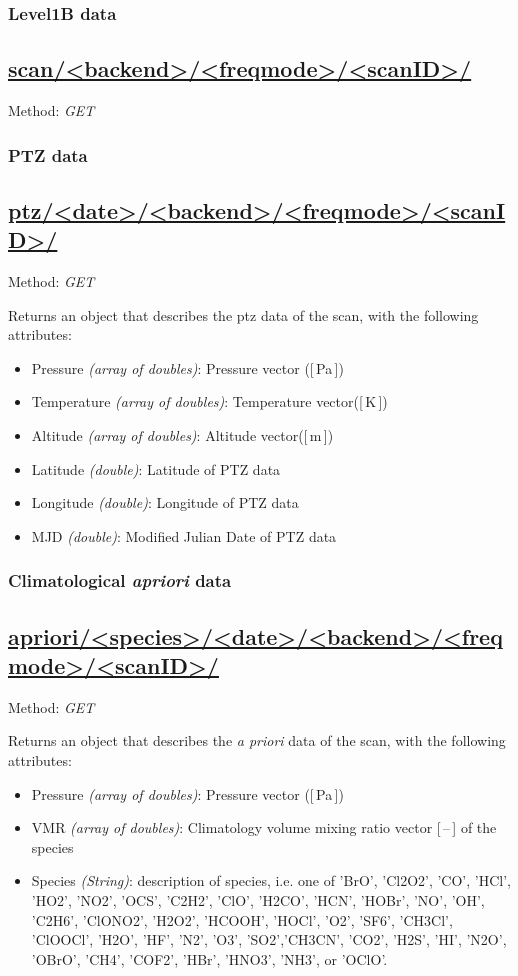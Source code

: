 \subsubsection{Level1B data}
\subsection*{\url{scan/<backend>/<freqmode>/<scanID>/}}
Method: \emph{GET}

\subsubsection{PTZ data}
\subsection*{\url{ptz/<date>/<backend>/<freqmode>/<scanID>/}}
Method: \emph{GET}

Returns an object that describes the ptz data of the scan,
with the following attributes:

\begin{itemize}
    \item Pressure \emph{(array of doubles)}: Pressure vector ([\,Pa\,])
    \item Temperature \emph{(array of doubles)}: Temperature vector([\,K\,])
    \item Altitude \emph{(array of doubles)}:  Altitude vector([\,m\,])
    \item Latitude \emph{(double)}: Latitude of PTZ data
    \item Longitude \emph{(double)}: Longitude of PTZ data
    \item MJD \emph{(double)}: Modified Julian Date of PTZ data

\end{itemize}

\subsubsection{Climatological \textit{apriori} data}
\subsection*{\url{apriori/<species>/<date>/<backend>/<freqmode>/<scanID>/}}
Method: \emph{GET}

Returns an object that describes the \textit{a priori} data of the scan,
with the following attributes:

\begin{itemize}
    \item Pressure \emph{(array of doubles)}: Pressure vector ([\,Pa\,])
    \item VMR \emph{(array of doubles)}: Climatology volume mixing ratio vector [\,--\,] of the species
    \item Species \emph{(String)}: description of species, i.e. one of 'BrO', 'Cl2O2', 'CO',
          'HCl', 'HO2', 'NO2', 'OCS', 'C2H2', 'ClO', 'H2CO', 'HCN', 'HOBr', 'NO', 'OH', 'C2H6',
          'ClONO2', 'H2O2', 'HCOOH', 'HOCl', 'O2', 'SF6', 'CH3Cl', 'ClOOCl', 'H2O', 'HF', 'N2', 'O3',
          'SO2','CH3CN', 'CO2', 'H2S', 'HI', 'N2O', 'OBrO', 'CH4', 'COF2', 'HBr', 'HNO3', 'NH3', or 'OClO'.
\end{itemize}

